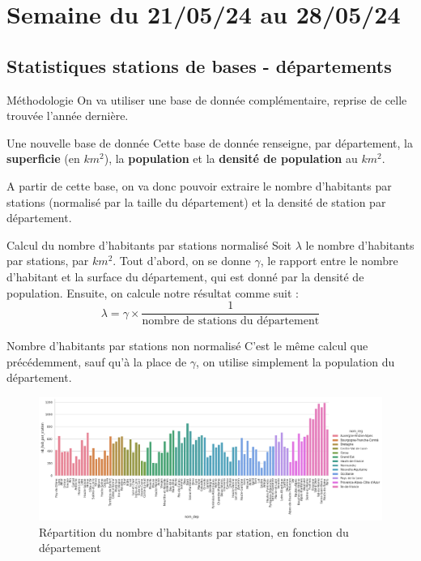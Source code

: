 \smallframetitle

\section{Semaine du 21/05/24 au 28/05/24}
\insertsectionframe

\subsection{Statistiques stations de bases - départements}
\insertsubsectionframe

\begin{frame}{Méthodologie}
    On va utiliser une base de donnée complémentaire, reprise de celle trouvée l'année dernière.

    \begin{block}{Une nouvelle base de donnée\footnotemark[1]}
        Cette base de donnée renseigne, par département, la \textbf{superficie} (en $\unit{km^2}$), la \textbf{population} et la \textbf{densité de population} au $\unit{km^2}$.
    \end{block}
    
    A partir de cette base, on va donc pouvoir extraire le nombre d'habitants par stations (normalisé par la taille du département) et la densité de station par département.

    \begin{block}{Calcul du nombre d'habitants par stations normalisé}
        Soit $\lambda$ le nombre d'habitants par stations, par $\unit{km^2}$. Tout d'abord, on se donne $\gamma$, le rapport entre le nombre d'habitant et la surface du département, qui est donné par la densité de population.
        Ensuite, on calcule notre résultat comme suit :$$\lambda = \gamma\times\frac{1}{\text{nombre de stations du département}}$$
    \end{block}

\end{frame}

\begin{frame}{Nombre d'habitants par stations non normalisé}
    C'est le même calcul que précédemment, sauf qu'à la place de $\gamma$, on utilise simplement la population du département.
    \begin{figure}
        \includegraphics[width=0.9\paperwidth]{images/barplots/nb_hab_par_station_par_dep.png}
        \caption{\label{fig:nb_hap_par_stat_par_dep}Répartition du nombre d'habitants par station, en fonction du département}
    \end{figure}
\end{frame}

